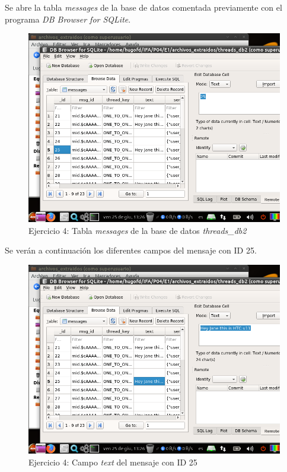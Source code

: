 \documentclass[11pt]{article}
\begin{document}
Se abre la tabla \textit{messages} de la base de datos comentada previamente con el programa \textit{DB Browser for SQLite}.

\begin{figure}[H]
    \caption{Ejercicio 4: Tabla \textit{messages} de la base de datos \textit{threads\_db2}}
    \centering
    \includegraphics[scale=0.7]{e4-3.png}
\end{figure}

Se verán a continuación los diferentes campos del mensaje con ID 25.

\begin{figure}[H]
    \caption{Ejercicio 4: Campo \textit{text} del mensaje con ID 25}
    \centering
    \includegraphics[scale=0.7]{e4-4.png}
\end{figure}
\end{document}
